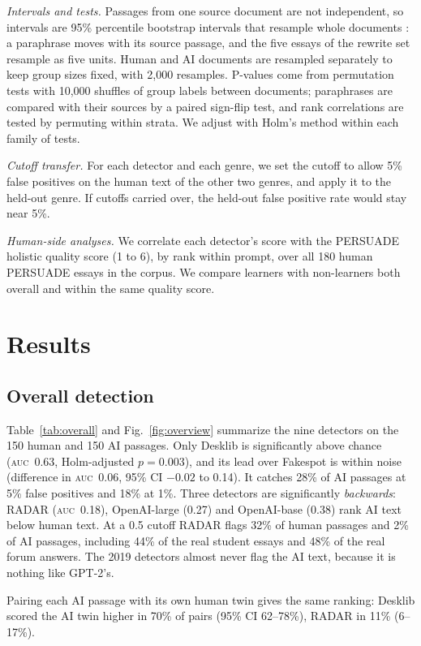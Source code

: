 \documentclass[conference]{IEEEtran}
\newcommand{\auc}{\textsc{auc}}
\begin{document}
\textit{Intervals and tests.} Passages from one source document are not independent, so intervals are 95\% percentile bootstrap intervals that resample whole documents \cite{efron,cameron}: a paraphrase moves with its source passage, and the five essays of the rewrite set resample as five units. Human and AI documents are resampled separately to keep group sizes fixed, with 2,000 resamples. P-values come from permutation tests with 10,000 shuffles of group labels between documents; paraphrases are compared with their sources by a paired sign-flip test, and rank correlations are tested by permuting within strata. We adjust with Holm's method \cite{holm} within each family of tests.

\textit{Cutoff transfer.} For each detector and each genre, we set the cutoff to allow 5\% false positives on the human text of the other two genres, and apply it to the held-out genre. If cutoffs carried over, the held-out false positive rate would stay near 5\%.

\textit{Human-side analyses.} We correlate each detector's score with the PERSUADE holistic quality score (1 to 6), by rank within prompt, over all 180 human PERSUADE essays in the corpus. We compare learners with non-learners both overall and within the same quality score.

\section{Results}
\subsection{Overall detection}
\label{sec:overall}
Table~\ref{tab:overall} and Fig.~\ref{fig:overview} summarize the nine detectors on the 150 human and 150 AI passages. Only Desklib is significantly above chance (\auc\ 0.63, Holm-adjusted $p=0.003$), and its lead over Fakespot is within noise (difference in \auc\ 0.06, 95\% CI $-0.02$ to 0.14). It catches 28\% of AI passages at 5\% false positives and 18\% at 1\%. Three detectors are significantly \emph{backwards}: RADAR (\auc\ 0.18), OpenAI-large (0.27) and OpenAI-base (0.38) rank AI text below human text. At a 0.5 cutoff RADAR flags 32\% of human passages and 2\% of AI passages, including 44\% of the real student essays and 48\% of the real forum answers. The 2019 detectors almost never flag the AI text, because it is nothing like GPT-2's.

Pairing each AI passage with its own human twin gives the same ranking: Desklib scored the AI twin higher in 70\% of pairs (95\% CI 62--78\%), RADAR in 11\% (6--17\%).
\end{document}
